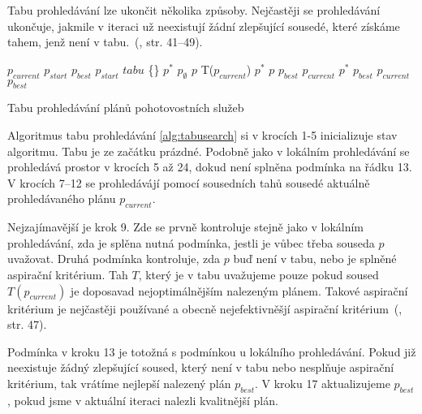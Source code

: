 Tabu prohledávání lze ukončit několika způsoby. Nejčastěji se prohledávání ukončuje, jakmile v iteraci už neexistují žádní zlepšující sousedé,
které získáme tahem, jenž není v tabu.~(\citet{GlovKoch03}, str. 41--49). 

\begin{algorithm}[H]
  \begin{algorithmic}[1]
    \State $p_{current}$ \gets $p_{start}$
    \State $p_{best}$ \gets $p_{start}$
    \State $tabu$ \gets \{\}
      \State $p^*$ \gets $p_{\emptyset}$ 
        \State $p$ \gets T($p_{current}$)
          \State $p^*$ \gets $p$
        \EndIf
      \EndFor
        \State \Return $p_{best}$
      \EndIf
      \State $p_{current}$ \gets $p^*$
        \State $p_{best}$ \gets $p_{current}$
      \EndIf
      \State {}
        \State {} 
      \EndIf
    \EndWhile
    \State \Return $p_{best}$
  \EndFunction
  \end{algorithmic}
  \caption{Tabu prohledávání plánů pohotovostních služeb}
  \label{alg:tabusearch}
\end{algorithm}

Algoritmus tabu prohledávání \ref{alg:tabusearch} si v krocích 1-5 inicializuje stav algoritmu. Tabu je ze začátku prázdné.
Podobně jako v lokálním prohledávání se prohledává prostor v krocích 5 až 24, dokud není splněna podmínka na řádku 13.
V krocích 7--12 se prohledávájí pomocí sousedních tahů sousedé aktuálně prohledávaného plánu $p_{current}$. 

Nejzajímavější je krok 9. Zde se prvně kontroluje stejně jako v lokálním prohledávání, zda je splěna nutná podmínka, jestli je vůbec třeba souseda $p$ uvažovat.
Druhá podmínka kontroluje, zda $p$ buď není v tabu, nebo je splněné aspirační kritérium.
Tah $T$, který je v tabu uvažujeme pouze pokud soused $T(p_{current})$ je doposavad nejoptimálnějším nalezeným plánem.
Takové aspirační kritérium je nejčastěji používané a obecně nejefektivněšjí aspirační kritérium~(\citet{GlovKoch03}, str. 47).

Podmínka v kroku 13 je totožná s podmínkou u lokálního prohledávání.
Pokud již neexistuje žádný zlepšující soused, který není v tabu nebo nesplňuje aspirační kritérium, tak vrátíme nejlepší nalezený plán $p_{best}$.
V kroku 17 aktualizujeme $p_{best}$, pokud jsme v aktuální iteraci nalezli kvalitnější plán.

